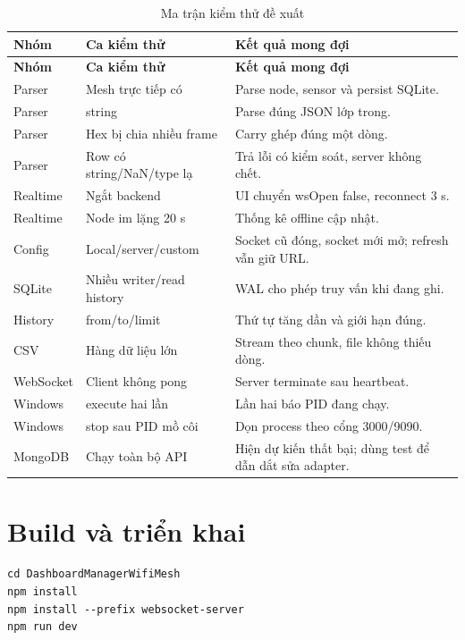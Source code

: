 \documentclass[a4paper]{article}
\newcommand{\codeword}[1]{\texttt{\detokenize{#1}}}
\begin{document}
\begin{longtable}{p{4.3cm}p{5cm}p{4.7cm}}
\caption{Ma trận kiểm thử đề xuất}\\
\toprule
\textbf{Nhóm} & \textbf{Ca kiểm thử} & \textbf{Kết quả mong đợi}\\
\midrule\endfirsthead
\toprule
\textbf{Nhóm} & \textbf{Ca kiểm thử} & \textbf{Kết quả mong đợi}\\
\midrule\endhead
Parser & Mesh trực tiếp có \codeword{M} & Parse node, sensor và persist SQLite.\\
Parser & \codeword{uart_rx.payload} string & Parse đúng JSON lớp trong.\\
Parser & Hex bị chia nhiều frame & Carry ghép đúng một dòng.\\
Parser & Row có string/NaN/type lạ & Trả lỗi có kiểm soát, server không chết.\\
Realtime & Ngắt backend & UI chuyển wsOpen false, reconnect 3 s.\\
Realtime & Node im lặng 20 s & Thống kê offline cập nhật.\\
Config & Local/server/custom & Socket cũ đóng, socket mới mở; refresh vẫn giữ URL.\\
SQLite & Nhiều writer/read history & WAL cho phép truy vấn khi đang ghi.\\
History & from/to/limit & Thứ tự tăng dần và giới hạn đúng.\\
CSV & Hàng dữ liệu lớn & Stream theo chunk, file không thiếu dòng.\\
WebSocket & Client không pong & Server terminate sau heartbeat.\\
Windows & execute hai lần & Lần hai báo PID đang chạy.\\
Windows & stop sau PID mồ côi & Dọn process theo cổng 3000/9090.\\
MongoDB & Chạy toàn bộ API & Hiện dự kiến thất bại; dùng test để dẫn dắt sửa adapter.\\
\bottomrule
\end{longtable}

\section{Build và triển khai}

\begin{lstlisting}[style=textstyle,caption={Cài đặt và chạy development}]
cd DashboardManagerWifiMesh
npm install
npm install --prefix websocket-server
npm run dev
\end{lstlisting}
\end{document}
